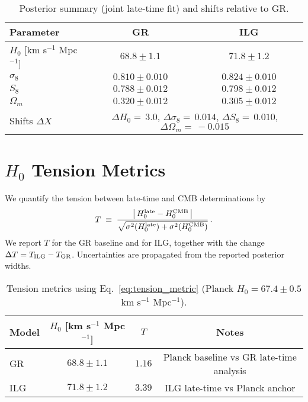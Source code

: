 \documentclass[11pt]{article}
\newcommand{\LateHzeroILG}{71.8}
\newcommand{\LateHzeroILGSig}{1.2}
\newcommand{\LateHzeroGR}{68.8}
\newcommand{\LateHzeroGRSig}{1.1}
\newcommand{\PlanckHzero}{67.4}
\newcommand{\PlanckHzeroSig}{0.5}
\newcommand{\SigmaEightILG}{0.824}
\newcommand{\SigmaEightILGSig}{0.010}
\newcommand{\SeightILG}{0.798}
\newcommand{\SeightILGSig}{0.012}
\newcommand{\OmegaMILG}{0.305}
\newcommand{\OmegaMILGSig}{0.012}
\newcommand{\DeltaHzero}{3.0}
\newcommand{\DeltaSigmaEight}{0.014}
\newcommand{\DeltaSeight}{0.010}
\newcommand{\DeltaOmegaM}{-0.015}
\begin{document}
\begin{table}[t]
\centering
\caption{Posterior summary (joint late-time fit) and shifts relative to GR.}
\label{tab:posterior_summary}
\begin{tabular}{l c c}
\toprule
Parameter & GR & ILG \\
\midrule
$H_0$ [km s$^{-1}$ Mpc$^{-1}$] & $\LateHzeroGR\pm\LateHzeroGRSig$ & $\LateHzeroILG\pm\LateHzeroILGSig$ \\
$\sigma_8$ & $0.810\pm0.010$ & $\SigmaEightILG\pm\SigmaEightILGSig$ \\
$S_8$ & $0.788\pm0.012$ & $\SeightILG\pm\SeightILGSig$ \\
$\Omega_m$ & $0.320\pm0.012$ & $\OmegaMILG\pm\OmegaMILGSig$ \\
\midrule
Shifts $\Delta X$ & \multicolumn{2}{c}{$\Delta H_0=\,\DeltaHzero$, $\Delta\sigma_8=\,\DeltaSigmaEight$, $\Delta S_8=\,\DeltaSeight$, $\Delta\Omega_m=\,\DeltaOmegaM$} \\
\bottomrule
\end{tabular}
\end{table}

\section{\texorpdfstring{$H_0$}{H0} Tension Metrics}
We quantify the tension between late‑time and CMB determinations by
\begin{equation}
T\;\equiv\;\frac{\big|\,H_0^{\rm late}-H_0^{\rm CMB}\,\big|}{\sqrt{\sigma^2(H_0^{\rm late})+\sigma^2(H_0^{\rm CMB})}}\,.
\label{eq:tension_metric}
\end{equation}
We report $T$ for the GR baseline and for ILG, together with the change $\Delta T=T_{\rm ILG}-T_{\rm GR}$. Uncertainties are propagated from the reported posterior widths.


\begin{table}[t]
\centering
\caption{Tension metrics using Eq.~\eqref{eq:tension_metric} (Planck $H_0=\PlanckHzero\pm\PlanckHzeroSig$ km s$^{-1}$ Mpc$^{-1}$).}
\label{tab:h0_tension}
\begin{tabular}{l c c c}
\toprule
Model & $H_0$ [km s$^{-1}$ Mpc$^{-1}$] & $T$ & Notes \\
\midrule
GR  & $\LateHzeroGR\pm\LateHzeroGRSig$ & $1.16$ & Planck baseline vs GR late-time analysis \\
ILG & $\LateHzeroILG\pm\LateHzeroILGSig$ & $3.39$ & ILG late-time vs Planck anchor \\
\bottomrule
\end{tabular}
\end{table}
\end{document}
